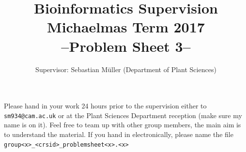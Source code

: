 \documentclass[11pt,runningheads,a4paper]{article}
\begin{document}

\title{{\LARGE Bioinformatics Supervision}\\
{\Large Michaelmas Term 2017}\\
{\Large --Problem Sheet 3--}} 

\author{Supervisor: Sebastian Müller (Department of Plant Sciences)}
\date{}

\maketitle

Please hand in your work 24 hours prior to the supervision either to \texttt{sm934@cam.ac.uk} or at the Plant Sciences Department reception (make sure my name is on it). 
Feel free to team up with other group members, the main aim is to understand the material. 
If you hand in electronically, please name the file \texttt{group<x>\_<crsid>\_problemsheet<x>.<x>}
\end{document}

